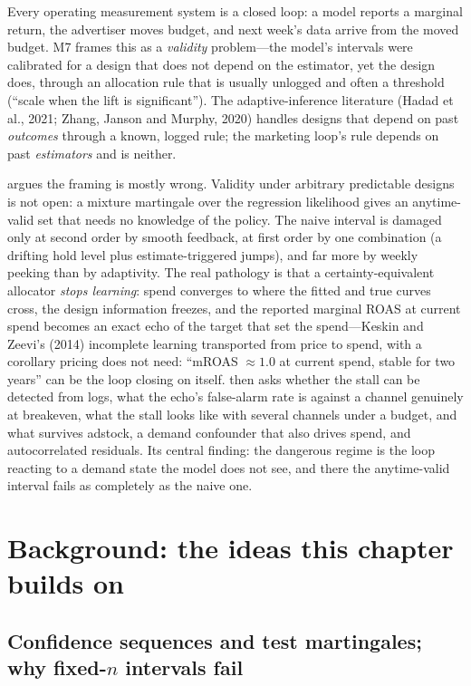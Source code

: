 Every operating measurement system is a closed loop: a model reports a marginal return, the advertiser moves budget, and next week's data arrive from the moved budget. M7 frames this as a \emph{validity} problem---the model's intervals were calibrated for a design that does not depend on the estimator, yet the design does, through an allocation rule that is usually unlogged and often a threshold (``scale when the lift is significant''). The adaptive-inference literature (Hadad et al., 2021; Zhang, Janson and Murphy, 2020) handles designs that depend on past \emph{outcomes} through a known, logged rule; the marketing loop's rule depends on past \emph{estimators} and is neither.

 argues the framing is mostly wrong. Validity under arbitrary predictable designs is not open: a mixture martingale over the regression likelihood gives an anytime-valid set that needs no knowledge of the policy. The naive interval is damaged only at second order by smooth feedback, at first order by one combination (a drifting hold level plus estimate-triggered jumps), and far more by weekly peeking than by adaptivity. The real pathology is that a certainty-equivalent allocator \emph{stops learning}: spend converges to where the fitted and true curves cross, the design information freezes, and the reported marginal ROAS at current spend becomes an exact echo of the target that set the spend---Keskin and Zeevi's (2014) incomplete learning transported from price to spend, with a corollary pricing does not need: ``mROAS $\approx 1.0$ at current spend, stable for two years'' can be the loop closing on itself.  then asks whether the stall can be detected from logs, what the echo's false-alarm rate is against a channel genuinely at breakeven, what the stall looks like with several channels under a budget, and what survives adstock, a demand confounder that also drives spend, and autocorrelated residuals. Its central finding: the dangerous regime is the loop reacting to a demand state the model does not see, and there the anytime-valid interval fails as completely as the naive one.

\section{Background: the ideas this chapter builds on}

\subsection{Confidence sequences and test martingales; why fixed-$n$ intervals fail}

